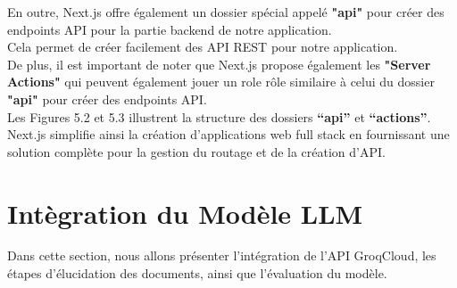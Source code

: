 \noindent En outre, Next.js offre également un dossier spécial appelé \textbf{"api"} pour créer des endpoints API pour la partie backend de notre application.\\
Cela permet de créer facilement des API REST pour notre application.\\
De plus, il est important de noter que Next.js propose également les \textbf{"Server Actions"} qui peuvent également jouer un role rôle similaire à celui du dossier \textbf{"api"} pour créer des endpoints API.\\
Les Figures 5.2 et 5.3 illustrent la structure des dossiers \textbf{“api”} et \textbf{“actions”}.\\



\noindent Next.js simplifie ainsi la création d'applications web full stack en fournissant une solution complète pour la gestion du routage et de la création d'API.




\section{Intègration du Modèle LLM}
Dans cette section, nous allons présenter l'intégration de l'API GroqCloud, les étapes d'élucidation des documents, ainsi que l'évaluation du modèle.

